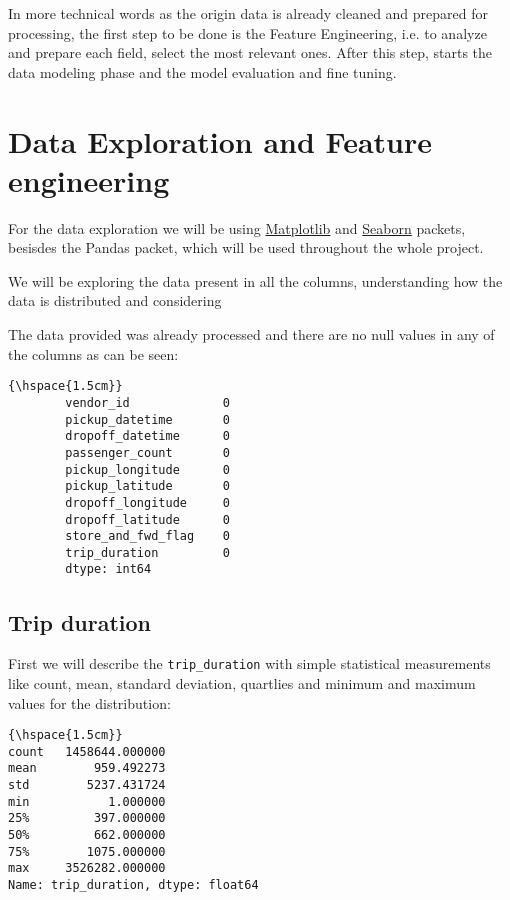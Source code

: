 \documentclass[11pt]{article}
\begin{document}
In more technical words as the origin data is already cleaned and prepared for processing, the first step to be done is the Feature Engineering, i.e. to analyze and prepare each field, select the most relevant ones. After this step, starts the data modeling phase and the model evaluation and fine tuning.
            
\section{Data Exploration and Feature engineering}

\hspace{0.5cm} For the data exploration we will be using \href{https://matplotlib.org/}{Matplotlib} and \href{https://seaborn.pydata.org/}{Seaborn} packets, besisdes the Pandas packet, which will be used throughout the whole project.

We will be exploring the data present in all the columns, understanding how the data is distributed and considering

The data provided was already processed and there are no null values in any of the columns as can be seen:

\begin{Verbatim}[commandchars=\\\{\}]
{\hspace{1.5cm}}
        vendor_id             0
        pickup_datetime       0
        dropoff_datetime      0
        passenger_count       0
        pickup_longitude      0
        pickup_latitude       0
        dropoff_longitude     0
        dropoff_latitude      0
        store_and_fwd_flag    0
        trip_duration         0
        dtype: int64
\end{Verbatim}

\subsection{Trip duration}

First we will describe the \texttt{trip\_duration} with simple statistical measurements like count, mean, standard deviation, quartlies and minimum and maximum values for the distribution:

\begin{Verbatim}[commandchars=\\\{\}]
{\hspace{1.5cm}} 
count   1458644.000000
mean        959.492273
std        5237.431724
min           1.000000
25%         397.000000
50%         662.000000
75%        1075.000000
max     3526282.000000
Name: trip_duration, dtype: float64
\end{Verbatim}
\end{document}
